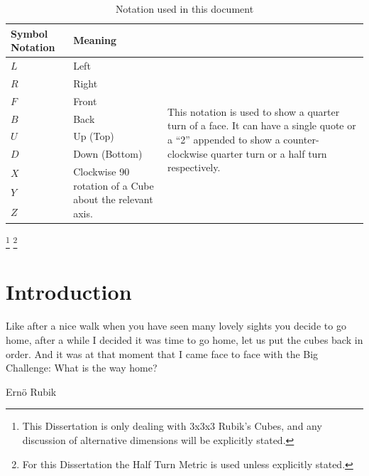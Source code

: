 \documentclass{report}
\begin{document}
	\begin{table}[htbp]
		\def\arraystretch{1.2}
		\centering
		\caption{Notation used in this document}
		\label{tab:notation}
		\begin{tabular}{m{}m{}m{}}
			\toprule
			\textbf{Symbol Notation} & \textbf{Meaning} \\
			\midrule
			$L$	&	Left			&	\multirow{9}{*}{\parbox{0.425\textwidth}{This notation is used to show a quarter turn of a face. It can have a single quote or a \enquote{2} appended to show a counter-clockwise quarter turn or a half turn respectively.}} \\
			$R$	&	Right			&	\\
			$F$	&	Front			&	\\
			$B$	&	Back			&	\\
			$U$	&	Up (Top)		&	\\
			$D$	&	Down (Bottom)	&	\\
			$X$ &	\multirow{ 3}{*}{\parbox{0.2\textwidth}{Clockwise 90\degree{} rotation of a Cube about the relevant axis.}} & \\
			$Y$ & & \\
			$Z$ & & \\
			\bottomrule
		\end{tabular}
	\end{table}
	\textcolor{white}{
		\footnote{\label{footnote:cube}This Dissertation is only dealing with 3x3x3 Rubik's Cubes, and any discussion of alternative dimensions will be explicitly stated.}
		\footnote{\label{footnote:metric}For this Dissertation the Half Turn Metric is used unless explicitly stated.}		
	}



	\newpage
	\tableofcontents
	\newpage

	\renewcommand{\thechapter}{\arabic{chapter}}
	\setcounter{chapter}{0}
	\chapter{Introduction}
	\epigraph{Like after a nice walk when you have seen many lovely sights you decide to go home, after a while I decided it was time to go home, let us put the cubes back in order. And it was at that moment that I came face to face with the Big Challenge: What is the way home?}{Ern\"{o} Rubik \cite{Rubik1986}}
	
\end{document}
